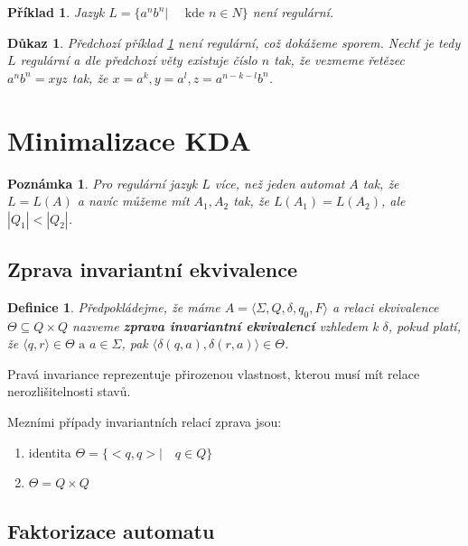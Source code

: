 \documentclass[10pt, a4paper, titlepage]{article}
\theoremstyle{note}
\newtheorem{dukaz}{Důkaz}
\newtheorem{definice}{Definice}
\newtheorem{priklad}{Příklad}
\newtheorem{poznamka}{Poznámka}
\begin{document}
\begin{priklad}\label{priklad-reg}
 Jazyk $L = \lbrace a^{n}b^{n} | \quad \text{ kde } n \in N \rbrace$ není regulární.
\end{priklad}

\begin{dukaz}
 Předchozí příklad \ref{priklad-reg} není regulární, což dokážeme sporem. Nechť je tedy $L$ regulární a dle předchozí
věty existuje číslo $n$ tak, že vezmeme řetězec $a^{n}b^{n} = xyz$ tak, že $x = a^{k}, y = a^{l}, z = a^{n-k-l}b^{n}$.
\end{dukaz}


\section{Minimalizace KDA}

\begin{poznamka}
Pro regulární jazyk $L$ více, než jeden automat $A$ tak, že $L = L(A)$ a navíc můžeme mít $A_{1}, A_{2}$ tak, že
$L(A_{1}) = L(A_{2})$, ale $|Q_{1}| < |Q_{2}|$.
\end{poznamka}

\subsection{Zprava invariantní ekvivalence}

\begin{definice}
Předpokládejme, že máme $A = \langle \Sigma, Q, \delta, q_{0}, F \rangle$ a relaci ekvivalence $\Theta \subseteq Q \times Q$ nazveme
\textbf{zprava invariantní ekvivalencí} vzhledem k $\delta$, pokud platí, že $\langle q,r  \rangle \in \Theta \text{ a } a \in \Sigma$,
pak $\langle  \delta(q, a), \delta(r, a) \rangle \in \Theta$.
\end{definice}

Pravá invariance reprezentuje přirozenou vlastnost, kterou musí mít relace nerozlišitelnosti stavů.

Mezními případy invariantních relací zprava jsou:
\begin{enumerate}
\item 
identita $\Theta = \lbrace <q,q> | \quad q \in Q \rbrace$
\item
$\Theta = Q \times Q$
\end{enumerate}

\subsection{Faktorizace automatu}
\end{document}
